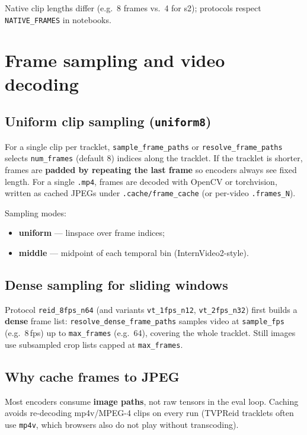 \documentclass[11pt,a4paper]{article}
\begin{document}
Native clip lengths differ (e.g.\ 8 frames vs.\ 4 for s2); protocols respect \texttt{NATIVE\_FRAMES} in notebooks.

\section{Frame sampling and video decoding}

\subsection{Uniform clip sampling (\texttt{uniform8})}
For a single clip per tracklet, \texttt{sample\_frame\_paths} or \texttt{resolve\_frame\_paths} selects \texttt{num\_frames} (default 8) indices along the tracklet.
If the tracklet is shorter, frames are \textbf{padded by repeating the last frame} so encoders always see fixed length.
For a single \texttt{.mp4}, frames are decoded with OpenCV or torchvision, written as cached JPEGs under \texttt{.cache/frame\_cache} (or per-video \texttt{.frames\_N}).

Sampling modes:
\begin{itemize}[noitemsep]
  \item \textbf{uniform} --- linspace over frame indices;
  \item \textbf{middle} --- midpoint of each temporal bin (InternVideo2-style).
\end{itemize}

\subsection{Dense sampling for sliding windows}
Protocol \texttt{reid\_8fps\_n64} (and variants \texttt{vt\_1fps\_n12}, \texttt{vt\_2fps\_n32}) first builds a \textbf{dense} frame list:
\texttt{resolve\_dense\_frame\_paths} samples video at \texttt{sample\_fps} (e.g.\ 8\,fps) up to \texttt{max\_frames} (e.g.\ 64), covering the whole tracklet.
Still images use subsampled crop lists capped at \texttt{max\_frames}.

\subsection{Why cache frames to JPEG}
Most encoders consume \textbf{image paths}, not raw tensors in the eval loop.
Caching avoids re-decoding mp4v/MPEG-4 clips on every run (TVPReid tracklets often use \texttt{mp4v}, which browsers also do not play without transcoding).
\end{document}
